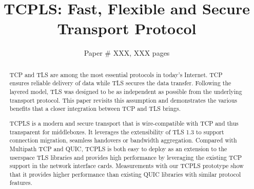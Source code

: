 \documentclass[sigconf]{acmart}
\begin{document}
\title{TCPLS: Fast, Flexible and Secure Transport Protocol}

\author{Paper \# XXX, XXX pages}

\renewcommand{\shortauthors}{X.et al.}


\begin{abstract}
  TCP and TLS are among the most essential protocols in today's Internet. TCP ensures reliable delivery of data while TLS secures the data transfer. Following the layered model, TLS was designed to be as independent as possible from the underlying transport protocol. This paper revisits this assumption and demonstrates the various benefits that a closer integration between TCP and TLS brings.

  TCPLS is a modern and secure transport that is wire-compatible with TCP and thus transparent for middleboxes. It leverages the extensibility of TLS 1.3 to support connection migration, seamless handovers or bandwidth aggregation. Compared with Multipath TCP and QUIC, TCPLS is both easy to deploy as an extension to the userspace TLS libraries and provides high performance by leveraging the existing TCP support in the network interface cards. Measurements with our TCPLS prototype show that it provides higher performance than existing QUIC libraries with similar protocol features.

\end{abstract}
\maketitle





\end{document}
